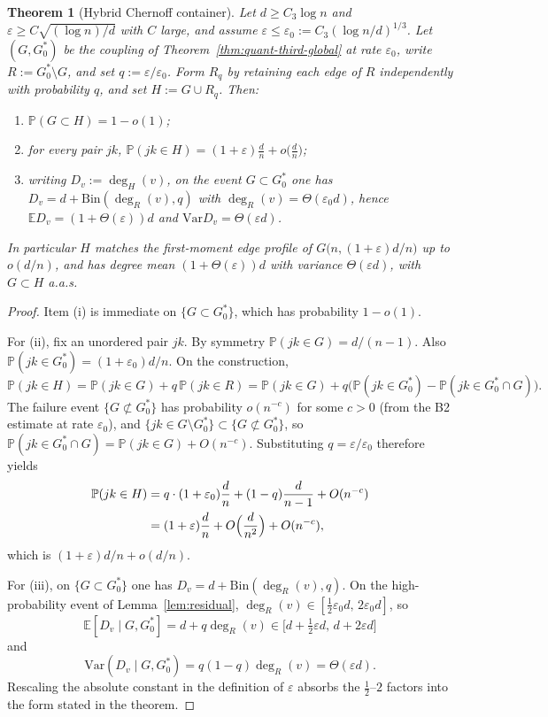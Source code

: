 \documentclass[11pt]{article}
\newtheorem{theorem}{Theorem}
\newcommand{\EE}{\mathbb{E}}
\newcommand{\PP}{\mathbb{P}}
\newcommand{\Var}{\mathrm{Var}}
\begin{document}
\begin{theorem}[Hybrid Chernoff container]
\label{thm:hybrid}
Let \(d\ge C_3\log n\) and
\(\varepsilon\ge C\sqrt{(\log n)/d}\) with \(C\) large, and assume
\(\varepsilon\le\varepsilon_0:=C_3(\log n/d)^{1/3}\).
Let \((G,G^*_0)\) be the coupling of Theorem~\ref{thm:quant-third-global} at rate
\(\varepsilon_0\), write \(R:=G^*_0\setminus G\), and set \(q:=\varepsilon/\varepsilon_0\).
Form \(R_q\) by retaining each edge of \(R\) independently with probability \(q\), and set
\(H:=G\cup R_q\).
Then:
\begin{enumerate}
\item \(\PP(G\subset H)=1-o(1)\);
\item for every pair \(jk\),
\(\PP(jk\in H)=(1+\varepsilon)\frac{d}{n}+o\bigl(\frac{d}{n}\bigr)\);
\item writing \(D_v:=\deg_H(v)\), on the event \(G\subset G^*_0\) one has
\(D_v=d+\mathrm{Bin}(\deg_R(v),q)\) with
\(\deg_R(v)=\Theta(\varepsilon_0 d)\), hence
\(\EE D_v=(1+\Theta(\varepsilon))d\) and \(\Var D_v=\Theta(\varepsilon d)\).
\end{enumerate}
In particular \(H\) matches the first-moment edge profile of
\(G\bigl(n,(1+\varepsilon)d/n\bigr)\) up to \(o(d/n)\), and has degree mean
\((1+\Theta(\varepsilon))d\) with variance \(\Theta(\varepsilon d)\), with \(G\subset H\) a.a.s.
\end{theorem}

\begin{proof}
Item (i) is immediate on \(\{G\subset G^*_0\}\), which has probability \(1-o(1)\).

For (ii), fix an unordered pair \(jk\). By symmetry
\(\PP(jk\in G)=d/(n-1)\).
Also \(\PP(jk\in G^*_0)=(1+\varepsilon_0)d/n\).
On the construction,
\[
\PP(jk\in H)
=\PP(jk\in G)+q\,\PP(jk\in R)
=\PP(jk\in G)+q\bigl(\PP(jk\in G^*_0)-\PP(jk\in G^*_0\cap G)\bigr).
\]
The failure event \(\{G\not\subset G^*_0\}\) has probability \(o(n^{-c})\) for some \(c>0\)
(from the B2 estimate at rate \(\varepsilon_0\)), and
\(\{jk\in G\setminus G^*_0\}\subset\{G\not\subset G^*_0\}\), so
\(\PP(jk\in G^*_0\cap G)=\PP(jk\in G)+O(n^{-c})\).
Substituting \(q=\varepsilon/\varepsilon_0\) therefore yields
\begin{align*}
\PP(jk\in H)
&=q\cdot(1+\varepsilon_0)\frac{d}{n}+(1-q)\frac{d}{n-1}+O(n^{-c})\\
&=(1+\varepsilon)\frac{d}{n}+O\Bigl(\frac{d}{n^2}\Bigr)+O(n^{-c}),
\end{align*}
which is \((1+\varepsilon)d/n+o(d/n)\).

For (iii), on \(\{G\subset G^*_0\}\) one has
\(D_v=d+\mathrm{Bin}(\deg_R(v),q)\).
On the high-probability event of Lemma~\ref{lem:residual},
\(\deg_R(v)\in[\tfrac12\varepsilon_0 d,\,2\varepsilon_0 d]\), so
\[
\EE[D_v\mid G,G^*_0]=d+q\deg_R(v)\in\bigl[d+\tfrac12\varepsilon d,\,d+2\varepsilon d\bigr]
\]
and
\[
\Var(D_v\mid G,G^*_0)=q(1-q)\deg_R(v)=\Theta(\varepsilon d).
\]
Rescaling the absolute constant in the definition of \(\varepsilon\) absorbs the
\(\tfrac12\)--\(2\) factors into the form stated in the theorem.
\end{proof}
\end{document}
